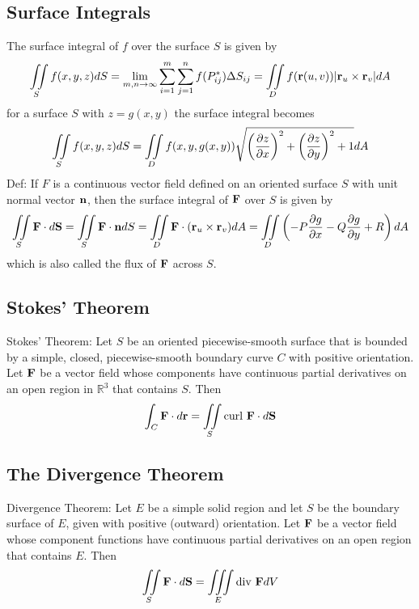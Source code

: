\documentclass{article}
\begin{document}
    \subsection{Surface Integrals}
    \begin{outline}
        \1 The surface integral of $f$ over the surface $S$ is given by \[\iint\limits_Sf(x,y,z)dS=\lim_{m,n\to\infty}\sum^m_{i=1}\sum^n_{j=1}f(P^*_{ij})\Delta S_{ij}=\iint\limits_Df(\vb r(u,v))|\vb r_u\times\vb r_v|dA\]
        \1 for a surface $S$ with \(z=g(x,y)\) the surface integral becomes \[\iint\limits_Sf(x,y,z)dS=\iint\limits_Df(x,y,g(x,y))\sqrt{\left(\pdv{z}{x}\right)^2+\left(\pdv{z}{y}\right)^2+1}dA\]
        \1 Def: If $F$ is a continuous vector field defined on an oriented surface $S$ with unit normal vector $\vb n$, then the surface integral of \(\vb F\) over $S$ is given by \[\iint\limits_S\vb F\cdot d\vb S=\iint\limits_S\vb F\cdot\vb ndS=\iint\limits_D\vb F\cdot(\vb r_u\times\vb r_v)dA=\iint\limits_D\left(-P\pdv{g}{x}-Q\pdv{g}{y}+R\right)dA\] which is also called the flux of \(\vb F\) across $S$. 

    \end{outline}
    \subsection{Stokes' Theorem}
    \begin{outline}
        \1 Stokes' Theorem: Let $S$ be an oriented piecewise-smooth surface that is bounded by a simple, closed, piecewise-smooth boundary curve $C$ with positive orientation. Let \(\vb F\) be a vector field whose components have continuous partial derivatives on an open region in \(\mathbb R^3\) that contains $S$. Then \[\int_C\vb F\cdot d\vb r=\iint\limits_S\text{curl }\vb F\cdot d\vb S\]

    \end{outline}
    \subsection{The Divergence Theorem}
    \begin{outline}
        \1 Divergence Theorem: Let $E$ be a simple solid region and let $S$ be the boundary surface of $E$, given with positive (outward) orientation. Let \(\vb F\) be a vector field whose component functions have continuous partial derivatives on an open region that contains $E$. Then \[\iint\limits_S\vb F\cdot d\vb S=\iiint\limits_E\text{div }\vb FdV\]

    \end{outline}
\end{document}
